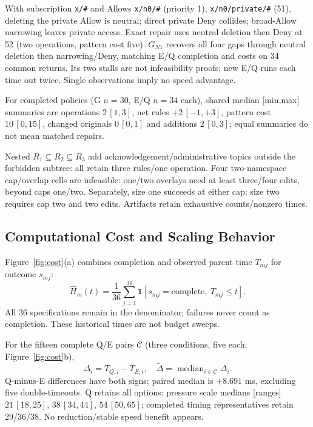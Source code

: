 \documentclass[letterpaper,journal]{IEEEtran}
\begin{document}
With subscription \texttt{x/\#} and Allows \texttt{x/n0/\#} (priority 1), \texttt{x/n0/private/\#} (51), deleting the private Allow is neutral; direct private Deny collides; broad-Allow narrowing leaves private access. Exact repair uses neutral deletion then Deny at 52 (two operations, pattern cost five). $G_{N1}$ recovers all four gaps through neutral deletion then narrowing/Deny, matching E/Q completion and costs on 34 common returns. Its two stalls are not infeasibility proofs; new E/Q runs each time out twice. Single observations imply no speed advantage.

For completed policies (G $n=30$, E/Q $n=34$ each), shared median [min,max] summaries are operations $2\,[1,3]$, net rules $+2\,[-1,+3]$, pattern cost $10\,[0,15]$, changed originals $0\,[0,1]$ and additions $2\,[0,3]$; equal summaries do not mean matched repairs.

Nested $R_1\subseteq R_2\subseteq R_3$ add acknowledgement/administrative topics outside the forbidden subtree: all retain three rules/one operation. Four two-namespace cap/overlap cells are infeasible: one/two overlays need at least three/four edits, beyond caps one/two. Separately, size one succeeds at either cap; size two requires cap two and two edits. Artifacts retain exhaustive counts/nonzero times.



\subsection{Computational Cost and Scaling Behavior}
Figure~\ref{fig:cost}(a) combines completion and observed parent time $T_{mj}$ for outcome $s_{mj}$:
\[
 \widehat H_m(t)=\frac{1}{36}\sum_{j=1}^{36}
 \mathbf{1}[s_{mj}=\mathrm{complete},\ T_{mj}\le t].
\]
All 36 specifications remain in the denominator; failures never count as completion. These historical times are not budget sweeps.

For the fifteen complete Q/E pairs $\mathcal C$ (three conditions, five each; Figure~\ref{fig:cost}b),
\begin{equation}\label{eq:paired}
 \Delta_i=T_{Q,i}-T_{E,i},\quad
 \widetilde\Delta=\operatorname{median}_{i\in\mathcal C}\Delta_i.
\end{equation}
Q-minus-E differences have both signs; paired median is $+8.691$ ms, excluding five double-timeouts. Q retains all options: pressure scale medians [ranges] $21\,[18,25]$, $38\,[34,44]$, $54\,[50,65]$; completed timing representatives retain 29/36/38. No reduction/stable speed benefit appears.
\end{document}
